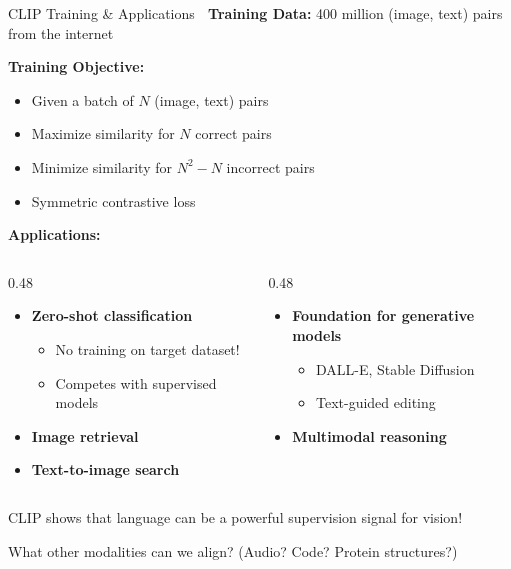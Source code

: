 \documentclass[aspectratio=169]{beamer}
\begin{document}
\begin{frame}[shrink=10]{CLIP Training \& Applications 🎨}
\textbf{Training Data:} 400 million (image, text) pairs from the internet

\vspace{0.5em}

\textbf{Training Objective:}
\begin{itemize}\setlength{\itemsep}{0pt}
    \item Given a batch of $N$ (image, text) pairs
    \item Maximize similarity for $N$ correct pairs
    \item Minimize similarity for $N^2 - N$ incorrect pairs
    \item Symmetric contrastive loss
\end{itemize}

\vspace{0.5em}

\textbf{Applications:}
\begin{columns}[T]
\begin{column}{0.48\textwidth}
\begin{itemize}\setlength{\itemsep}{0pt}
    \item \textbf{Zero-shot classification}
    \begin{itemize}\setlength{\itemsep}{0pt}
        \item No training on target dataset!
        \item Competes with supervised models
    \end{itemize}
    \item \textbf{Image retrieval}
    \item \textbf{Text-to-image search}
\end{itemize}
\end{column}

\begin{column}{0.48\textwidth}
\begin{itemize}\setlength{\itemsep}{0pt}
    \item \textbf{Foundation for generative models}
    \begin{itemize}\setlength{\itemsep}{0pt}
        \item DALL-E, Stable Diffusion
        \item Text-guided editing
    \end{itemize}
    \item \textbf{Multimodal reasoning}
\end{itemize}
\end{column}
\end{columns}

\vspace{0.5em}

\begin{thinkbox}
CLIP shows that language can be a powerful supervision signal for vision!

What other modalities can we align? (Audio? Code? Protein structures?)
\end{thinkbox}
\end{frame}
\end{document}

